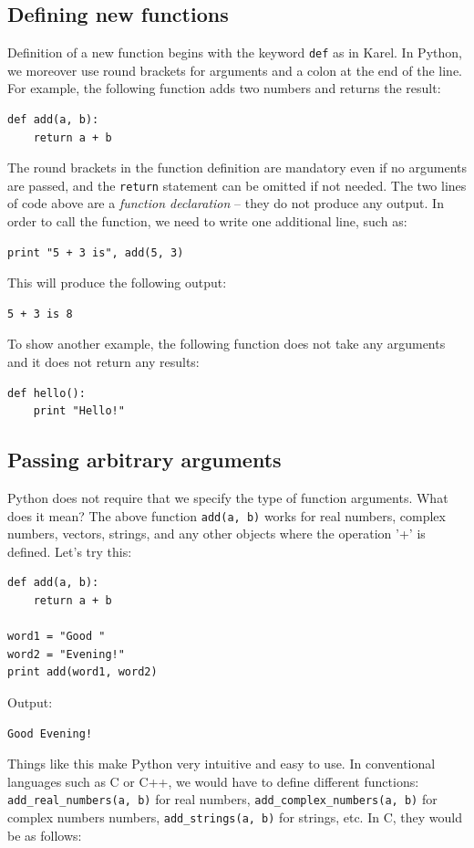 \subsection{Defining new functions}

Definition of a new function begins with the keyword {\tt def} as in Karel. In Python,
we moreover use round brackets for arguments and a colon at the end of the line. 
For example, the following function adds two numbers
and returns the result:

\begin{verbatim}
def add(a, b):
    return a + b
\end{verbatim}
The round brackets in the function definition are mandatory even if no arguments are passed,
and the {\tt return} statement can be omitted if not needed.
The two lines of code above 
are a {\em function declaration} -- they do not produce any output.
In order to call the function, we need to write one additional line, such as:

\begin{verbatim}
print "5 + 3 is", add(5, 3)
\end{verbatim}
This will produce the following output:

\begin{verbatim}
5 + 3 is 8
\end{verbatim}
To show another example, the following function does not take any arguments 
and it does not return any results:

\begin{verbatim}
def hello():
    print "Hello!"
\end{verbatim}

\subsection{Passing arbitrary arguments}

Python does not require that we specify the type of function arguments. 
What does it mean? The above function {\tt add(a, b)} works for real
numbers, complex numbers, vectors, strings, and any other 
objects where the operation '+' is defined. Let's try this:

\begin{verbatim}
def add(a, b):
    return a + b

word1 = "Good "
word2 = "Evening!"
print add(word1, word2)
\end{verbatim}
Output:

\begin{verbatim}
Good Evening!
\end{verbatim}
Things like this make Python very intuitive and easy to use. In conventional languages such as C or C++, 
we would have to define different functions: {\tt add\_real\_numbers(a, b)} for real numbers,
{\tt add\_complex\_numbers(a, b)} for complex numbers numbers, {\tt add\_strings(a, b)} for strings, etc. 
In C, they would be as follows:

